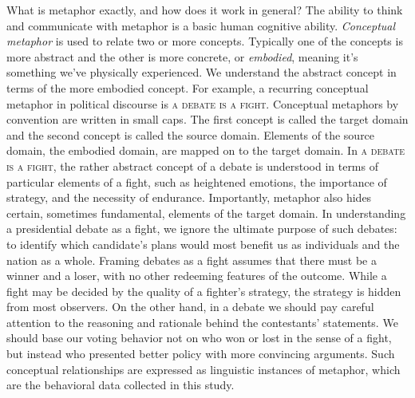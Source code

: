What is metaphor exactly, and how does it work in general? The ability to 
think and communicate with metaphor is a basic human cognitive ability.
\textit{Conceptual metaphor} is used to relate two or more 
concepts.  Typically one of the concepts is more abstract and the other is
more concrete, or \textit{embodied}, meaning it's something we've physically
experienced. We understand the abstract concept in terms of the more embodied
concept. For example, a recurring conceptual metaphor in political discourse
is \textsc{a debate is a fight}. Conceptual metaphors by convention are written
in small caps. The first concept is called the target domain and the second 
concept is called the source domain. Elements of the source domain, the embodied
domain, are mapped on to the target domain. In \textsc{a debate is a fight}, 
the rather abstract concept of a debate is understood in terms of particular
elements of a fight, such as heightened emotions, the importance of
strategy, and the necessity of endurance. Importantly, metaphor also hides 
certain, sometimes fundamental, elements of the target domain. In understanding
a presidential debate as a fight, we ignore the ultimate purpose of such debates:
to identify which candidate's plans would most benefit us as individuals and
the nation as a whole. Framing debates as a fight assumes that there must be
a winner and a loser, with no other redeeming features of the outcome. While
a fight may be decided by the quality of a fighter's strategy, the strategy is
hidden from most observers. On the other hand, in a debate we should pay careful
attention to the reasoning and rationale behind the contestants' statements.
We should base our voting behavior not on who won or lost in the sense of a
fight, but instead who presented better policy with more convincing arguments.
Such conceptual relationships are expressed as linguistic instances of metaphor,
which are the behavioral data collected in this study. 

